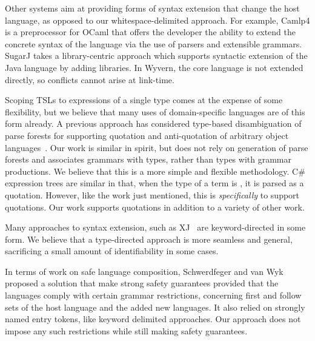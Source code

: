 Other systems aim at providing forms of syntax extension that change the host language, as opposed to our whitespace-delimited approach.  For example, Camlp4 \cite{camlp4} is a preprocessor for OCaml that offers the developer the ability to extend the concrete syntax of the language via the use of parsers and extensible grammars.  SugarJ \cite{Erdweg:2011:SLL:2048147.2048199} takes a library-centric approach which supports syntactic extension of the Java language by adding libraries. In Wyvern, the core language is not extended directly, so conflicts cannot arise at link-time. 

Scoping TSLs to expressions of a single type comes at the expense of some flexibility, but we believe that many uses of domain-specific languages are of this form already. A previous approach has considered type-based disambiguation of parse forests for supporting quotation and anti-quotation of arbitrary object languages~\cite{bravenboer2005generalized}. Our work is similar in spirit, but does not rely on generation of parse forests and associates grammars with types, rather than types with grammar productions. We believe that this is a more simple and flexible methodology. 
 C\# expression trees \cite{Csharp} are similar in that, when the type of a term is , it is parsed as a quotation. However, like the work just mentioned, this is \emph{specifically} to support quotations. Our work supports quotations in addition to a variety of other work.
 
Many approaches to syntax extension, such as XJ~\cite{DBLP:conf/scam/ClarkSW08} are keyword-directed in some form. We believe that a type-directed approach is more seamless and general, sacrificing a small amount of identifiability in some cases. 

In terms of work on safe language composition, Schwerdfeger and van Wyk~\cite{Schwerdfeger:2009:VCD:1542476.1542499} proposed a solution that make strong safety guarantees provided that the languages comply with certain grammar restrictions, concerning first and follow sets of the host language and the added new languages. It also relied on strongly named entry tokens, like keyword delimited approaches. Our approach does not impose any such restrictions while still making safety guarantees.%


